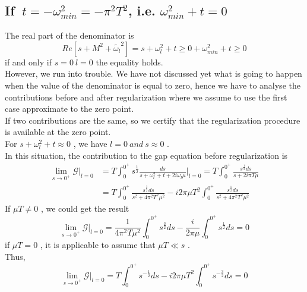 \documentclass{article}
\begin{document}
\subsection{If \texorpdfstring{$\ t=-\omega_{min}^2=-\pi^2T^2$}{}, i.e. \texorpdfstring{$\omega_{min}^2+t=0$}{}}\label{2.2.2}
The real part of the denominator is
\begin{equation}
    Re\left[s+M^2+\widetilde{\omega_l}^2\right]=s+\omega_l^2+t\geq0+\omega_{min}^2+t\geq 0 
\end{equation}
if and only if $s=0 \ l=0$ the equality holds.
\\However, we run into trouble. We have not discussed yet what is going to happen when the value of the denominator is equal to zero, hence we have to analyse the contributions before and after regularization where we assume to use the first case approximate to the zero point.\\
If two contributions are the same, so we certify that the regularization procedure is available at the zero point.\\
For $s+\omega_l^2+t\approx 0$ , we have $l=0\ and\ s\approx0$ .\\
In this situation, the contribution to the gap equation before regularization is
\begin{equation}
    \begin{split}
        \lim_{s\rightarrow 0^+}\mathcal{G} \lvert_{l=0}
        &=T\int_{0}^{0^+}s^{\frac{1}{2}} \frac{ds}{s+\omega_l^2+t+2i\omega_l\mu}\lvert_{l=0}
        =T\int_{0}^{0^+}\frac{s^{\frac{1}{2}}ds}{s+2i\pi T\mu}\\
        &=T\int_{0}^{0^+}\frac{s^{\frac{3}{2}}ds}{s^2+4\pi^2 T^2\mu^2}- i2\pi \mu T^2\int_{0}^{0^+}\frac{s^{\frac{1}{2}}ds}{s^2+4\pi^2 T^2\mu^2}     
    \end{split}
\end{equation}
If $\mu T\neq0$ , we could get the result
\begin{equation}
    \lim_{s\rightarrow 0^+}\mathcal{G} \lvert_{l=0}
    =\frac{1}{4\pi^2 T\mu^2}\int_{0}^{0^+}s^{\frac{3}{2}}ds-\frac{i}{2\pi \mu}\int_{0}^{0^+}s^{\frac{1}{2}}ds
    =0 
\end{equation} 
if $\mu T=0$ , it is applicable to assume that $\mu T\ll s$ .
\\Thus,
\begin{equation}
    \lim_{s\rightarrow 0^+}\mathcal{G} \lvert_{l=0}
    =T\int_{0}^{0^+}s^{-\frac{1}{2}}ds- i2\pi \mu T^2\int_{0}^{0^+}s^{-\frac{3}{2}}ds
    =0 
\end{equation} 
\end{document}
